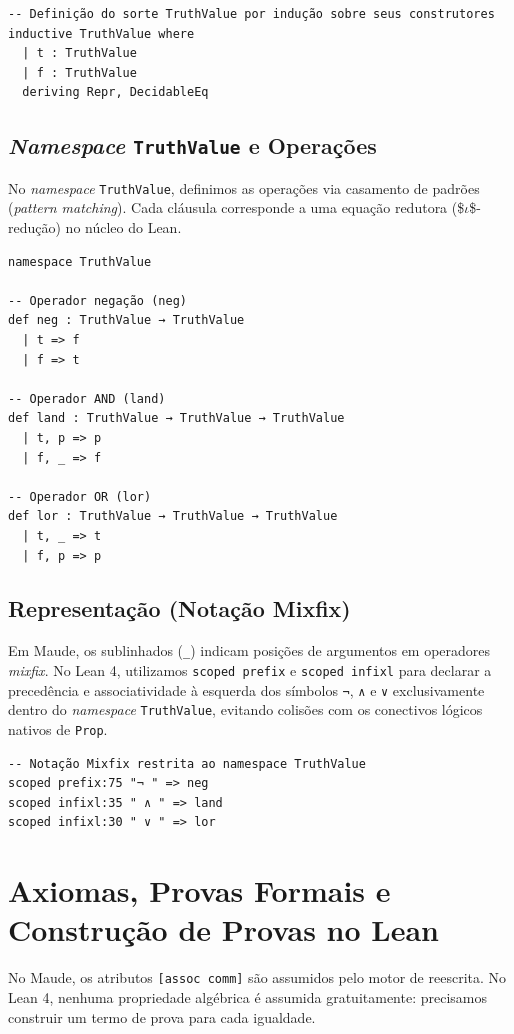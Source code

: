 \documentclass[11pt,a4paper]{scrartcl}
\begin{document}
\begin{lstlisting}[language=lean4,numbers=none]
-- Definição do sorte TruthValue por indução sobre seus construtores
inductive TruthValue where
  | t : TruthValue
  | f : TruthValue
  deriving Repr, DecidableEq
\end{lstlisting}
\subsection{\emph{Namespace} \texttt{TruthValue} e Operações}
\label{sec:orgf45b4fb}
No \emph{namespace} \texttt{TruthValue}, definimos as operações via casamento de padrões (\emph{pattern matching}). Cada cláusula corresponde a uma equação redutora (\$\(\iota\)\$-redução) no núcleo do Lean.

\begin{lstlisting}[language=lean4,numbers=none]
namespace TruthValue

-- Operador negação (neg)
def neg : TruthValue → TruthValue
  | t => f
  | f => t

-- Operador AND (land)
def land : TruthValue → TruthValue → TruthValue
  | t, p => p
  | f, _ => f

-- Operador OR (lor)
def lor : TruthValue → TruthValue → TruthValue
  | t, _ => t
  | f, p => p
\end{lstlisting}
\subsection{Representação (Notação Mixfix)}
\label{sec:org7b1414c}
Em Maude, os sublinhados (\texttt{\_}) indicam posições de argumentos em operadores \emph{mixfix}. No Lean 4, utilizamos \texttt{scoped prefix} e \texttt{scoped infixl} para declarar a precedência e associatividade à esquerda dos símbolos \texttt{¬}, \texttt{∧} e \texttt{∨} exclusivamente dentro do \emph{namespace} \texttt{TruthValue}, evitando colisões com os conectivos lógicos nativos de \texttt{Prop}.

\begin{lstlisting}[language=lean4,numbers=none]
-- Notação Mixfix restrita ao namespace TruthValue
scoped prefix:75 "¬ " => neg
scoped infixl:35 " ∧ " => land
scoped infixl:30 " ∨ " => lor
\end{lstlisting}
\section{Axiomas, Provas Formais e Construção de Provas no Lean}
\label{sec:org1ef9c12}
No Maude, os atributos \texttt{[assoc comm]} são assumidos pelo motor de reescrita. No Lean 4, nenhuma propriedade algébrica é assumida gratuitamente: precisamos construir um termo de prova para cada igualdade.
\end{document}
